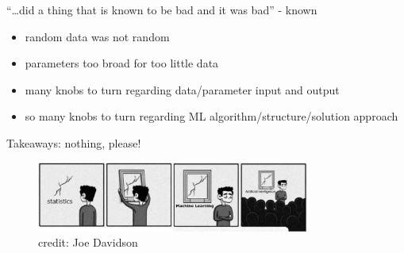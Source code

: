 \documentclass{beamer}
\newcommand{\mybox}[3]{{\color{#1}\framebox{\color{#2}#3}}}
\begin{document}
    \begin{frame}{\mybox{green}{blue}{Summary}}
        ``\ldots did a thing that is known to be bad and it was bad'' - known
        \vspace{0.1cm}
        \begin{itemize}
            \item random data was not random
            \item parameters too broad for too little data
            \item many knobs to turn regarding data/parameter input and output
            \item so many knobs to turn regarding ML algorithm/structure/solution approach
        \end{itemize}
        \vspace{0.5cm}
        Takeaways: nothing, please!
        \vspace{0.5cm}
        \begin{figure}
            \includegraphics[width=0.8\textwidth]{./imgs/ml_meme_flat.pdf}
            \caption*{credit: Joe Davidson}
        \end{figure}
    \end{frame}


\end{document}
